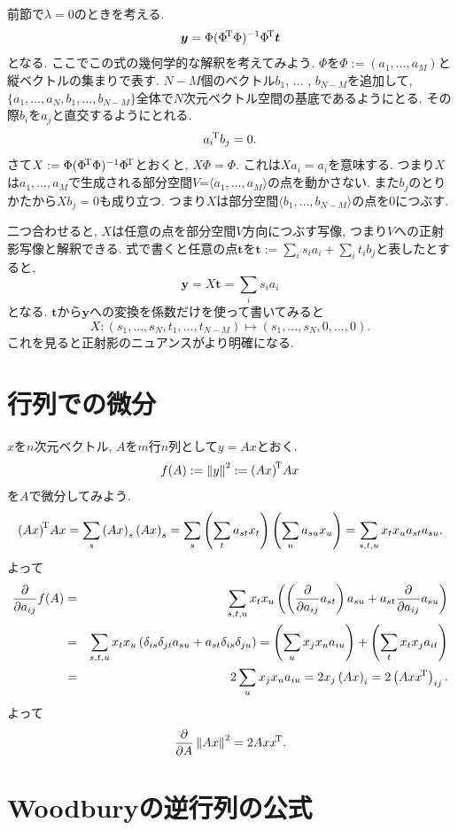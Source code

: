 前節で$\lambda = 0$のときを考える.
$$\bm{y}=\Phi({\Phi}^{\!\mathrm{T}}\Phi)^{-1}{\Phi}^{\!\mathrm{T}}\bm{t}$$
となる. ここでこの式の幾何学的な解釈を考えてみよう.
$\Phi$を$\Phi:=(a_1, \ldots, a_M)$と縦ベクトルの集まりで表す.
$N-M$個のベクトル$b_1$, $\ldots$ , $b_{N-M}$を追加して,
$\{a_1, \ldots, a_N, b_1, \ldots, b_{N-M}\}$全体で$N$次元ベクトル空間の基底であるようにとる.
その際$b_i$を$a_j$と直交するようにとれる.
$$
{a_i}^{\!\mathrm{T}}b_j=0.
$$
さて$X:=\Phi({\Phi}^{\!\mathrm{T}}\Phi)^{-1}{\Phi}^{\!\mathrm{T}}$とおくと, $X\Phi = \Phi$.
これは$Xa_i = a_i$を意味する.
つまり$X$は$a_1, \ldots, a_M$で生成される部分空間$V$=$\langle a_1, \ldots, a_M \rangle$の点を動かさない.
また$b_j$のとりかたから$Xb_j=0$も成り立つ.
つまり$X$は部分空間$\langle b_1, \ldots, b_{N-M} \rangle$の点を$0$につぶす.

二つ合わせると, $X$は任意の点を部分空間$V$方向につぶす写像, つまり$V$への正射影写像と解釈できる.
式で書くと任意の点$\bm{t}$を$\bm{t} := \sum_i s_i a_i + \sum_i t_i b_j$と表したとすると,
$$
\bm{y}=X\bm{t}=\sum_i s_i a_i
$$
となる. $\bm{t}$から$\bm{y}$への変換を係数だけを使って書いてみると
$$
X\colon (s_1, \ldots, s_N, t_1, \ldots, t_{N-M}) \mapsto (s_1, \ldots, s_N, 0, \ldots, 0).
$$
これを見ると正射影のニュアンスがより明確になる.

\section{行列での微分}

$x$を$n$次元ベクトル, $A$を$m$行$n$列として$y=Ax$とおく.
$$f(A) := \Norm{y}^2:=\trans{\left(Ax\right)}Ax$$
を$A$で微分してみよう.
$${\left(Ax\right)}^{\!\mathrm{T}}Ax=\sum_s \left(Ax\right)_s \left(Ax\right)_s = \sum_s \left(\sum_t a_{st}x_t\right) \left(\sum_u a_{su}x_u\right) = \sum_{s,t,u} x_t x_u a_{st}a_{su}.$$
よって
\begin{eqnarray*}
\frac{\partial}{\partial a_{ij}}f(A)
 &=& \sum_{s,t,u} x_t x_u \left(\left(\frac{\partial}{\partial a_{ij}}a_{st}\right) a_{su} + a_{st} \frac{\partial}{\partial a_{ij}}a_{su}\right)\\
 &=& \sum_{s,t,u}x_t x_u\left(\delta_{is}\delta_{jt}a_{su} + a_{st} \delta_{is}\delta_{ju}\right)
 = \left(\sum_u x_j x_u a_{iu}\right) + \left(\sum_t x_t x_j a_{it}\right)\\
 &=& 2\sum_u x_j x_u a_{iu}
 = 2x_j \left(Ax\right)_i
 = 2\left(Ax{x}^{\!\mathrm{T}}\right)_{ij}.
\end{eqnarray*}
よって
$$
\dif{A}\Norm{Ax}^2 = 2Ax\trans{x}.
$$
\vspace{0pt}

\section{Woodburyの逆行列の公式}

